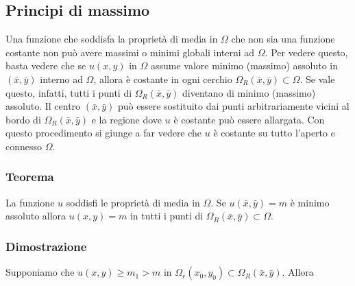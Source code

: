 \subsection{Principi di massimo}
Una funzione che soddisfa la propriet\`a di media in $\Omega$ che non sia
una funzione costante non pu\`o avere massimi o minimi globali interni ad $\Omega$.
Per vedere questo, basta vedere che se $u(x,y)$ in $\Omega$ assume valore
minimo (massimo) assoluto in $(\bar{x}, \bar{y})$ interno ad $\Omega$, 
allora \`e costante in ogni cerchio $\Omega_R(\bar{x}, \bar{y})\subset \Omega$.
Se vale questo, infatti, tutti i punti di $\Omega_R(\bar{x}, \bar{y})$ diventano
di minimo (massimo) assoluto.
Il centro $(\bar{x}, \bar{y})$ pu\`o essere sostituito dai punti arbitrariamente
vicini al bordo di $\Omega_R(\bar{x}, \bar{y})$ e la regione dove $u$ \`e costante
pu\`o essere allargata.
Con questo procedimento si giunge a far vedere che $u$ \`e costante su tutto
l'aperto e connesso $\Omega$.
\subsubsection{Teorema}
La  funzione $u$ soddisfi le propriet\`a di media in $\Omega$.
Se $u(\bar{x}, \bar{y})=m$ \`e minimo assoluto allora $u(x,y)=m$ in tutti
i punti di $\Omega_R(\bar{x}, \bar{y})\subset \Omega$.
\subsubsection{Dimostrazione}
Supponiamo che $u(x,y)\geq m_1 > m$ in $\Omega_r (x_0, y_0)\subset \Omega_R (\bar{x}, \bar{y})$.
Allora
